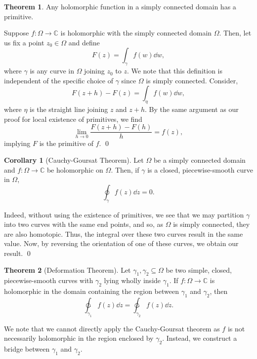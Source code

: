 \documentclass[
]{article}
\theoremstyle{definition}
\newtheorem{theorem}{Theorem}
\newtheorem{corollary}{Corollary}[theorem]
\theoremstyle{definition}
\begin{document}
\begin{theorem}
  Any holomorphic function in a simply connected domain has a primitive.
\end{theorem}
\proof

Suppose \(f : \Omega \to \mathbb{C}\) is holomorphic with the simply
connected domain \(\Omega\). Then, let us fix a point \(z_0 \in \Omega\)
and define \[F(z) = \int_\gamma f(w) \dd w,\] where \(\gamma\) is any
curve in \(\Omega\) joining \(z_0\) to \(z\). We note that this
definition is independent of the specific choice of \(\gamma\) since
\(\Omega\) is simply connected. Consider,
\[F(z + h) - F(z) = \int_\eta f(w) \dd w,\] where \(\eta\) is the
straight line joining \(z\) and \(z + h\). By the same argument as our
proof for local existence of primitives, we find
\[\lim_{h \to 0} \frac{F(z + h) - F(h)}{h} = f(z),\] implying \(F\) is
the primitive of \(f\). \qed

\begin{corollary}[Cauchy-Goursat Theorem]
  Let \(\Omega\) be a simply connected domain and \(f : \Omega \to \mathbb{C}\) 
  be holomorphic on \(\Omega\). Then, if \(\gamma\) is a closed, piecewise-smooth 
  curve in \(\Omega\), 
  \[\oint_\gamma f(z) \dd z = 0.\]
\end{corollary}
\proof

Indeed, without using the existence of primitives, we see that we may
partition \(\gamma\) into two curves with the same end points, and so,
as \(\Omega\) is simply connected, they are also homotopic. Thus, the
integral over these two curves result in the same value. Now, by
reversing the orientation of one of these curves, we obtain our result.
\qed

\begin{theorem}[Deformation Theorem]
  Let \(\gamma_1, \gamma_2 \subseteq \Omega\) be two simple, closed, 
  piecewise-smooth curves with \(\gamma_2\) lying wholly inside \(\gamma_1\). 
  If \(f : \Omega \to \mathbb{C}\) is holomorphic in the domain containing the 
  region between \(\gamma_1\) and \(\gamma_2\), then 
  \[\ointctrclockwise_{\gamma_1} f(z) \dd z = \ointctrclockwise_{\gamma_2} f(z) \dd z.\]
\end{theorem}

\proof

We note that we cannot directly apply the Cauchy-Goursat theorem as
\(f\) is not necessarily holomorphic in the region enclosed by
\(\gamma_2\). Instead, we construct a bridge between \(\gamma_1\) and
\(\gamma_2\).
\end{document}

